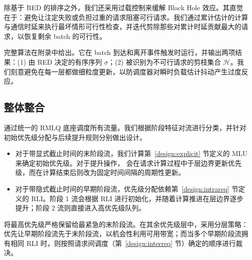 除基于 RED 的排序之外，我们还采用过载控制来缓解 Black Hole 效应。其直觉在于：避免让注定失败或负担过重的请求阻塞可行请求。我们通过累计估计的计算与通信时延来执行最坏情形可行性检查，并迭代剪除那些对累计时延贡献最大的请求，以恢复剩余 batch 的可行性。

完整算法在附录中给出。它在 batch 到达和离开事件触发时运行，并输出两项结果：(1) 由 RED 决定的有序序列 $\sigma$；(2) 被识别为不可行请求的剪枝集合 $\mathcal{H}$。我们刻意避免在每一层都做细粒度更新，以防调度器对瞬时负载估计抖动产生过度反应。

\subsection{整体整合}\label{sec:design:PET}

\sys 通过统一的 RMLQ 底座调度所有流量。我们根据阶段特征对流进行分类，并针对初始优先级分配与后续提升规则分别做出设计。

\begin{itemize}[leftmargin=*]
    \item 对于带显式截止时间的末阶段流，我们计算第~\ref{design:explicit} 节定义的 MLU 来确定初始优先级。对于提升操作，\sys{} 会在请求计算过程中于层边界更新优先级，而在计算结束后则改为固定时间间隔的周期性更新。
    \item 对于带隐式截止时间的早期阶段流，优先级分配依赖第~\ref{design:intrareq} 节定义的 RLI。阶段 1 流会根据 RLI 进行初始化，并随着计算推进在层边界逐步提升；阶段 2 流则直接进入高优先级队列。
\end{itemize}

 \sys 将最高优先级严格保留给最紧急的末阶段流。在其余优先级层中，\sys 采用分层策略：优先让早期阶段流先于末阶段流，以机会性利用可用带宽；而当多个早期阶段流拥有相同 RLI 时，则按照请求间调度（第~\ref{design:interreq} 节）确定的顺序进行裁决。
